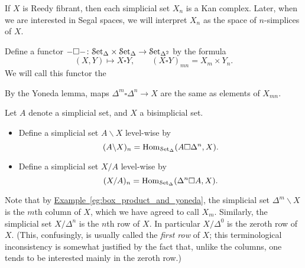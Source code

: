 \documentclass[main.tex]{subfiles}
\begin{document}
If $X$ is Reedy fibrant, then each simplicial set $X_{n}$ is a Kan complex. Later, when we are interested in Segal spaces, we will interpret $X_{n}$ as the space of $n$-simplices of $X$.

\begin{definition}
  Define a functor $- \square -\colon \mathcal{S}\mathrm{et}_{\Delta} \times \mathcal{S}\mathrm{et}_{\Delta} \to \mathcal{S}\mathrm{et}_{\Delta^{2}}$ by the formula
  \begin{equation*}
    (X, Y) \mapsto X \square Y,\qquad (X \square Y)_{mn} = X_{m} \times Y_{n}.
  \end{equation*}
  We will call this functor the 
\end{definition}

\begin{example}
  \label{eg:box_product_and_yoneda}
  By the Yoneda lemma, maps $\Delta^{m} \square \Delta^{n} \to X$ are the same as elements of $X_{mn}$.
\end{example}

\begin{definition}
  \label{def:left_and_right_divison_functors}
  Let $A$ denote a simplicial set, and $X$ a bisimplicial set.
  \begin{itemize}
    \item Define a simplicial set $A \backslash X$ level-wise by
      \begin{equation*}
        (A \backslash X)_{n} = \mathrm{Hom}_{\mathcal{S}\mathrm{et}_{\Delta}}(A \square \Delta^{n}, X).
      \end{equation*}

    \item Define a simplicial set $X / A$ level-wise by
      \begin{equation*}
        (X / A)_{n} = \mathrm{Hom}_{\mathcal{S}\mathrm{et}_{\Delta}}(\Delta^{n} \square A, X).
      \end{equation*}
  \end{itemize}
\end{definition}

Note that by \hyperref[eg:box_product_and_yoneda]{Example~\ref*{eg:box_product_and_yoneda}}, the simplicial set $\Delta^{m} \backslash X$ is the $m$th column of $X$, which we have agreed to call $X_{m}$. Similarly, the simplicial set $X / \Delta^{n}$ is the $n$th row of $X$. In particular $X / \Delta^{0}$ is the zeroth row of $X$. (This, confusingly, is usually called the \emph{first row} of $X$; this terminological inconsistency is somewhat justified by the fact that, unlike the columns, one tends to be interested mainly in the zeroth row.)
\end{document}
